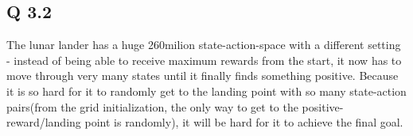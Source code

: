 \documentclass{article}
\begin{document}
\subsection{Q 3.2}

The lunar lander has a huge 260milion state-action-space with a different setting - instead of being able to receive maximum rewards from the start, it now has to move through very many states until it finally finds something positive. Because it is so hard for it to randomly get to the landing point with so many state-action pairs(from the grid initialization, the only way to get to the positive-reward/landing point is randomly), it will be hard for it to achieve the final goal. 
\end{document}
